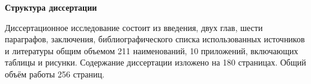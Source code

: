 \textbf{Структура диссертации}

Диссертационное исследование состоит из введения, двух глав, шести параграфов, заключения, библиографического списка использованных источников и литературы общим объемом 211 наименований, 10 приложений, включающих таблицы и рисунки. Содержание диссертации изложено на 180 страницах. Общий объём работы 256 страниц.
